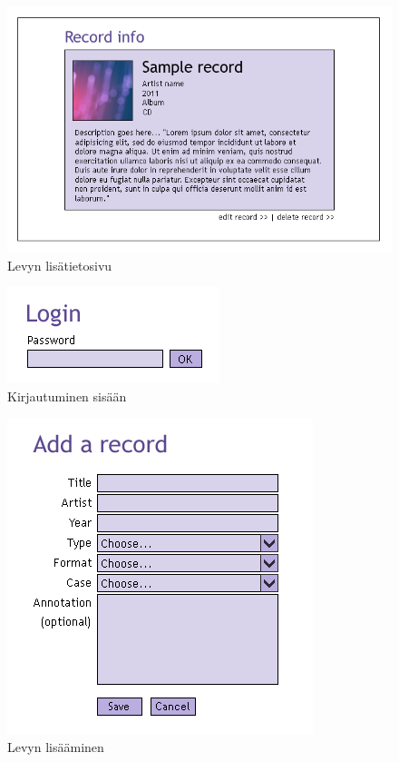 \documentclass[a4paper,12pt]{report}
\begin{document}
\begin{figure}[H]
\begin{center}
\includegraphics[width=\textwidth]{recordinfopage}
\end{center}
\caption{Levyn lisätietosivu}
\end{figure}

\begin{figure}[H]
\begin{center}
\includegraphics[]{login}
\end{center}
\caption{Kirjautuminen sisään}
\end{figure}

\begin{figure}[H]
\begin{center}
\includegraphics[]{addpage}
\end{center}
\caption{Levyn lisääminen}
\end{figure}
\end{document}
